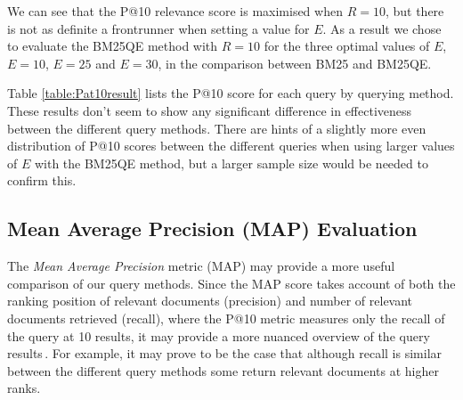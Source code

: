 We can see that the P@10 relevance score is maximised when $R=10$, but there is not as definite a frontrunner when setting a value for $E$. As a result we chose to evaluate the BM25QE method with $R=10$ for the three optimal values of $E$, $E=10$, $E=25$ and $E=30$, in the comparison between BM25 and BM25QE.

\begin{centering}
\begin{table}
\caption {P@10 relevance score for each query method}\label{table:Pat10result}
\end{table}
\end{centering}

\newpage
Table \ref{table:Pat10result} lists the P@10 score for each query by querying method. These results don't seem to show any significant difference in effectiveness between the different query methods. There are hints of a slightly more even distribution of P@10 scores between the different queries when using larger values of $E$ with the BM25QE method, but a larger sample size would be needed to confirm this.

\newpage
\subsection{Mean Average Precision (MAP) Evaluation}
The \textit{Mean Average Precision} metric (MAP) may provide a more useful comparison of our query methods. Since the MAP score takes account of both the ranking position of relevant documents (precision) and number of relevant documents retrieved (recall), where the P@10 metric measures only the recall of the query at 10 results, it may provide a more nuanced overview of the query results\,\cite[pp. 159-162]{manning2008introduction}. For example, it may prove to be the case that although recall is similar between the different query methods some return relevant documents at higher ranks.

